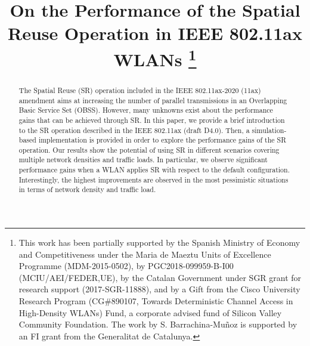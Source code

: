\documentclass[conference]{IEEEtran}
\begin{document}
	
	\title{On the Performance of the Spatial Reuse Operation in IEEE 802.11ax WLANs
		\thanks{This  work  has  been  partially  supported  by  the Spanish Ministry of Economy and Competitiveness under the Maria de Maeztu  Units  of  Excellence  Programme (MDM-2015-0502), by PGC2018-099959-B-I00 (MCIU/AEI/FEDER,UE), by the Catalan Government under SGR grant for research support (2017-SGR-11888),  and  by a Gift from the Cisco University Research Program (CG\#890107, Towards Deterministic Channel Access in High-Density WLANs) Fund, a corporate advised fund of Silicon Valley Community Foundation. The work by S. Barrachina-Mu\~noz is supported by an FI grant from the Generalitat de Catalunya.}}
	
	\author{
		\and
		\and
	}
	
	\maketitle
	
	\begin{abstract}
		The Spatial Reuse (SR) operation included in the IEEE 802.11ax-2020 (11ax) amendment aims at increasing the number of parallel transmissions in an Overlapping Basic Service Set (OBSS). However, many unknowns exist about the performance gains that can be achieved through SR. In this paper, we provide a brief introduction to the SR operation described in the IEEE 802.11ax (draft D4.0). Then, a simulation-based implementation is provided in order to explore the performance gains of the SR operation. Our results show the potential of using SR in different scenarios covering multiple network densities and traffic loads. In particular, we observe significant performance gains when a WLAN applies SR with respect to the default configuration. Interestingly, the highest improvements are observed in the most pessimistic situations in terms of network density and traffic load.
	\end{abstract}
	
\end{document}
